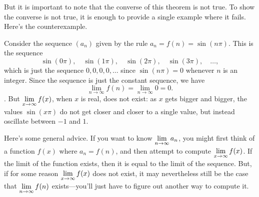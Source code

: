 But it is important to note that the converse of this theorem is
not true.  To show the converse is not true, it is enough to provide a
single example where it fails.  Here's the counterexample.

\begin{example}
  Consider the sequence $(a_n)$ given by the rule $a_n = f(n)=\sin(n\pi)$.  This is the sequence
$$
  \sin(0\pi),\quad \sin(1\pi),\quad\sin(2\pi),\quad\sin(3\pi),\quad\ldots,
$$
which is just the sequence $0, 0, 0, 0, \ldots$ since $\sin(n\pi)=0$
whenever $n$ is an integer.  Since the sequence is just the constant sequence, we have
$$
\lim_{n\to\infty} f(n)= \lim_{n\to\infty} 0 = 0. 
$$. But $\displaystyle \lim_{x\to\infty}f(x)$, when $x$ is real, does not exist: as $x$ gets
bigger and bigger, the values $\sin(x\pi)$ do not get closer and
closer to a single value, but instead oscillate between $-1$ and $1$.
\end{example} 

Here's some general advice. If you want to know $\displaystyle \lim_{n\to\infty}
a_n$, you might first think of a function $f(x)$ where $a_n = f(n)$,
and then attempt to compute $\displaystyle \lim_{x\to\infty}f(x)$.  If the limit
of the function exists, then it is equal to the limit of the sequence.
But, if for some reason $\displaystyle \lim_{x\to\infty}f(x)$ does not exist, it
may nevertheless still be the case that $\displaystyle \lim_{n\to\infty}f(n)$
exists---you'll just have to figure out another way to compute it.


